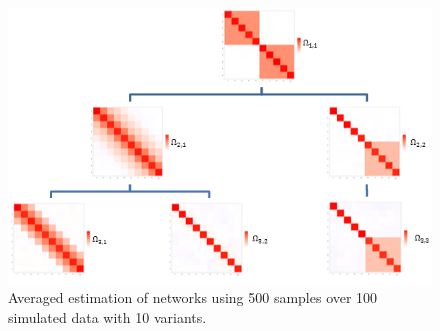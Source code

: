 \documentclass[10pt]{article}
\begin{document}
\begin{figure}
\begin{center}
 \includegraphics{graphhat1000.png}
\end{center}
\caption{Averaged estimation of networks using 500 samples over 100 simulated data with 10 variants.}
\label{fig:structure3}
\end{figure}

\begin{figure}
\begin{center}
\end{center}
\label{fig:structure4}
\end{figure}

\begin{figure}
\begin{center}
\end{center}
\label{fig:structure5}
\end{figure}


\begin{figure}
\begin{center}
\end{center}
\label{fig:structure6}
\end{figure}

\begin{figure}
\begin{center}
\end{center}
\label{fig:structure7}
\end{figure}
\end{document}
